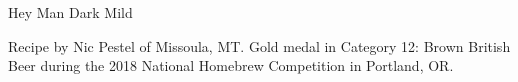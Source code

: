 \begin{recipe}{Hey Man Dark Mild} %

\begin{aboutblock}
Recipe by Nic Pestel of Missoula, MT. Gold medal in Category 12: Brown British
Beer during the 2018 National Homebrew Competition in Portland, OR. 
\sourceaha
\end{aboutblock}


\begin{methodandtiming}

\begin{mashsteps}
\end{mashsteps}

\begin{fermentationsteps}
\end{fermentationsteps}

\end{methodandtiming}

\recipebreak

\begin{ingredientsblock}

\begin{malts}
\end{malts}

\begin{hops}
\end{hops}


\end{ingredientsblock}

\end{recipe}


